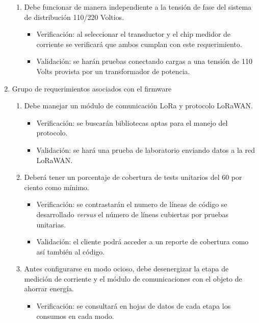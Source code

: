\documentclass[11pt]{charter}
\begin{document}
\begin{enumerate}
\begin{enumerate}[label*=\arabic*.]
			\item Debe funcionar de manera independiente a la tensión de fase del sistema de distribución 110/220 Voltios.
				\begin{itemize}
					\item Verificación: al seleccionar el transductor y el chip medidor de corriente se verificará que ambos cumplan con este requerimiento.\\
					\item Validación: se harán pruebas conectando cargas a una tensión de 110 Volts provista por un transformador de potencia.\\
				\end{itemize}			

	\end{enumerate}
	\item Grupo de requerimientos asociados con el firmware
		\begin{enumerate}[label*=\arabic*.]
			\item Debe manejar un módulo de comunicación LoRa y protocolo LoRaWAN.
				\begin{itemize}
					\item Verificación: se buscarán bibliotecas aptas para el manejo del protocolo.\\
					\item Validación: se hará una prueba de laboratorio enviando datos a la red LoRaWAN.\\
				\end{itemize}
			\item Deberá tener un porcentaje de cobertura de tests unitarios del 60 por ciento como mínimo.
				\begin{itemize}
					\item Verificación: se contrastarán el numero de líneas de código se desarrollado \textit{versus} el número de líneas cubiertas por pruebas unitarias.\\
					\item Validación: el cliente podrá acceder a un reporte de cobertura como así también al código.\\
				\end{itemize}
			\item Antes configurarse en modo ocioso, debe desenergizar la etapa de medición de corriente y el módulo de comunicaciones con el objeto de ahorrar energía.
				\begin{itemize}
					\item Verificación: se consultará en hojas de datos de cada etapa los consumos en cada modo.\\

\end{itemize}
\end{enumerate}
\end{enumerate}
\end{document}
